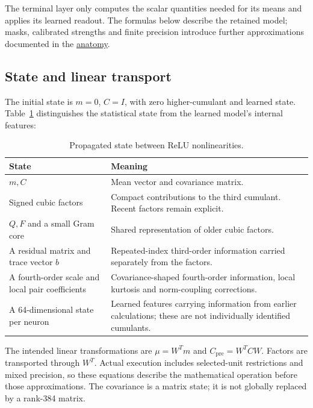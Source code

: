 \documentclass[11pt,letterpaper]{article}
\begin{document}
The terminal layer only computes the scalar quantities needed for its means and applies its learned readout. The formulas below describe the retained model; masks, calibrated strengths and finite precision introduce further approximations documented in the \href{https://github.com/mattliston/arc-whitebox-estimation-challenge/blob/main/estimator/ANATOMY.md}{anatomy}.

\subsection{State and linear transport}\label{state-and-linear-transport}

The initial state is \(m=0\), \(C=I\), with zero higher-cumulant and learned state. Table~\ref{tab:state} distinguishes the statistical state from the learned model's internal features:

\begin{table}[htbp]
\centering
\small
\caption{Propagated state between ReLU nonlinearities.}\label{tab:state}
\begin{tabular}{@{}>{\raggedright\arraybackslash}p{}>{\raggedright\arraybackslash}p{}@{}}
\toprule
State & Meaning \\
\midrule
\(m,C\) & Mean vector and covariance matrix. \\[3pt]
Signed cubic factors & Compact contributions to the third cumulant. Recent factors remain explicit. \\[3pt]
\(Q,F\) and a small Gram core & Shared representation of older cubic factors. \\[3pt]
A residual matrix and trace vector \(b\) & Repeated-index third-order information carried separately from the factors. \\[3pt]
A fourth-order scale and local pair coefficients & Covariance-shaped fourth-order information, local kurtosis and norm-coupling corrections. \\[3pt]
A 64-dimensional state per neuron & Learned features carrying information from earlier calculations; these are not individually identified cumulants. \\[3pt]
\bottomrule
\end{tabular}
\end{table}

The intended linear transformations are \(\mu=W^Tm\) and \(C_{\mathrm{pre}}=W^TCW\). Factors are transported through \(W^T\). Actual execution includes selected-unit restrictions and mixed precision, so these equations describe the mathematical operation before those approximations. The covariance is a matrix state; it is not globally replaced by a rank-384 matrix.
\end{document}
